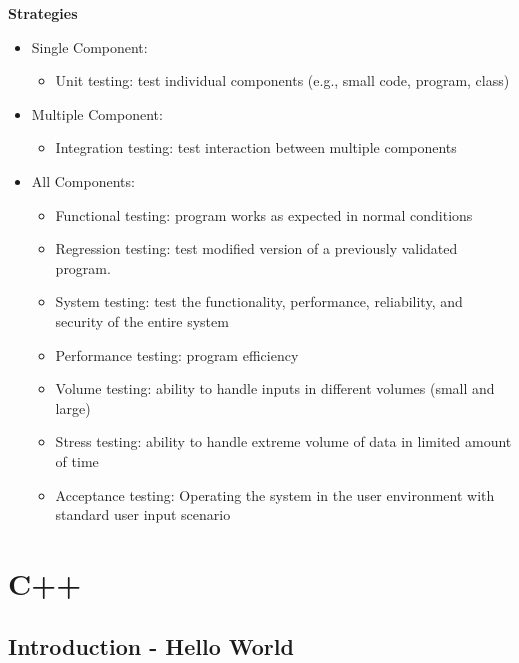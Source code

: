 \documentclass[english, 11pt]{article}
\begin{document}
    \textbf{Strategies}
    \begin{itemize}
    \item Single Component:
      \begin{itemize}
        \item Unit testing: test individual components (e.g., small code, program, class)
      \end{itemize}
    \item Multiple Component:
       \begin{itemize}
         \item Integration testing: test interaction between multiple components
       \end{itemize}
    \item All Components:
    \begin{itemize}
      \item Functional testing: program works as expected in normal conditions
      \item Regression testing: test modified version of a previously validated program.
      \item System testing: test the functionality, performance, reliability, and security of the entire system
      \item Performance testing: program efficiency
      \item Volume testing: ability to handle inputs in different volumes (small and large)
       \item Stress testing: ability to handle extreme volume of data in limited amount of time
       \item Acceptance testing: Operating the system in the user environment with standard user input scenario
    \end{itemize}
    \end{itemize}

    \section{C++}

    \subsection{Introduction - Hello World}
\end{document}
